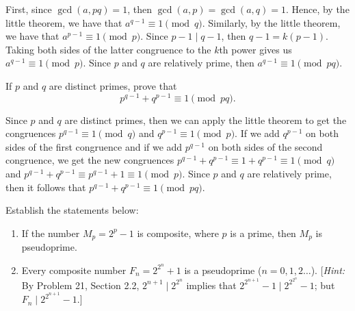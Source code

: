 \begin{solution}
    First, since $\gcd(a, pq) = 1$, then $\gcd(a, p) = \gcd(a, q) = 1$. Hence, by the little theorem, we have that $a^{q-1} \equiv 1 \pmod q$. Similarly, by the little theorem, we have that $a^{p-1} \equiv 1 \pmod p$. Since $p-1 \mid q-1$, then $q-1 = k(p-1)$. Taking both sides of the latter congruence to the $k$th power gives us $a^{q-1} \equiv 1 \pmod p$. Since $p$ and $q$ are relatively prime, then $a^{q-1} \equiv 1 \pmod{pq}$. \\
\end{solution}

\begin{exercise}
    If $p$ and $q$ are distinct primes, prove that
    $$p^{q-1} + q^{p-1} \equiv 1 \pmod{pq}.$$
\end{exercise}

\begin{solution}
    Since $p$ and $q$ are distinct primes, then we can apply the little theorem to get the congruences $p^{q-1} \equiv 1 \pmod{q}$ and $q^{p-1} \equiv 1 \pmod{p}$. If we add $q^{p-1}$ on both sides of the first congruence and if we add $p^{q-1}$ on both sides of the second congruence, we get the new congruences $p^{q-1} + q^{p-1} \equiv 1 + q^{p-1} \equiv 1 \pmod{q}$ and $p^{q-1} + q^{p-1} \equiv p^{q-1} + 1 \equiv 1 \pmod{p}$. Since $p$ and $q$ are relatively prime, then it follows that $p^{q-1} + q^{p-1} \equiv 1 \pmod{pq}$. \\
\end{solution}

\begin{exercise}
    Establish the statements below:
    \begin{enumerate}
        \item If the number $M_p = 2^p - 1$ is composite, where $p$ is a prime, then $M_p$ is pseudoprime.
        \item Every composite number $F_n = 2^{2^n} + 1$ is a pseudoprime ($n = 0,1,2\dots$). [\textit{Hint:} By Problem 21, Section 2.2, $2^{n+1} \mid 2^{2^n}$ implies that $2^{2^{n+1}} - 1 \mid 2^{2^{2^n}} - 1$; but $F_n \mid 2^{2^{n+1}} - 1$.]
    \end{enumerate}
\end{exercise}

